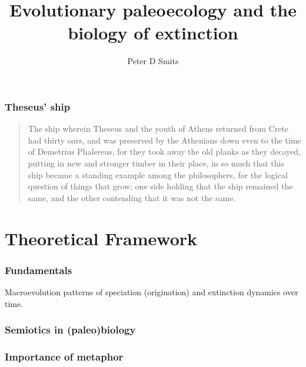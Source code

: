 \documentclass{beamer}
\title{Evolutionary paleoecology and the biology of extinction}
\author{Peter D Smits}
\institute{Committee on Evolutionary Biology, University of Chicago}
\begin{document}
\begin{frame}
  \maketitle
\end{frame}

\begin{frame}
  \frametitle{Theseus' ship}

  \begin{quotation}
    The ship wherein Theseus and the youth of Athens returned from Crete had thirty oars, and was preserved by the Athenians down even to the time of Demetrius Phalereus, for they took away the old planks as they decayed, putting in new and stronger timber in their place, in so much that this ship became a standing example among the philosophers, for the logical question of things that grow; one side holding that the ship remained the same, and the other contending that it was not the same.

  \end{quotation}

\end{frame}

\begin{frame}
  \tableofcontents
\end{frame}


\section{Theoretical Framework}
\begin{frame}
  \frametitle{Fundamentals}

  \begin{block}{\alert{Macroevolution}}
    patterns of speciation (origination) and extinction dynamics over time.
  \end{block}


\end{frame}

\begin{frame}
  \frametitle{Semiotics in (paleo)biology}

\end{frame}

\begin{frame}
  \frametitle{Importance of metaphor}

\end{frame}
\end{document}
